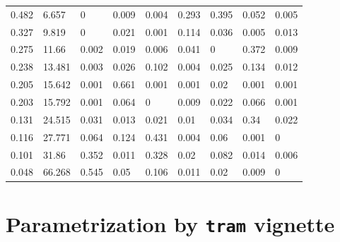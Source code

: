 \documentclass[11pt,a4paper,twoside]{book}\usepackage[]{graphicx}\usepackage[]{xcolor}
\begin{document}
\begin{table}[H]
\begin{center}
\begin{tabular}{lllllllll}
  0.482 & 6.657 & 0 & 0.009 & 0.004 & 0.293 & 0.395 & 0.052 & 0.005 \\ 
  0.327 & 9.819 & 0 & 0.021 & 0.001 & 0.114 & 0.036 & 0.005 & 0.013 \\ 
  0.275 & 11.66 & 0.002 & 0.019 & 0.006 & 0.041 & 0 & 0.372 & 0.009 \\ 
  0.238 & 13.481 & 0.003 & 0.026 & 0.102 & 0.004 & 0.025 & 0.134 & 0.012 \\ 
  0.205 & 15.642 & 0.001 & 0.661 & 0.001 & 0.001 & 0.02 & 0.001 & 0.001 \\ 
  0.203 & 15.792 & 0.001 & 0.064 & 0 & 0.009 & 0.022 & 0.066 & 0.001 \\ 
  0.131 & 24.515 & 0.031 & 0.013 & 0.021 & 0.01 & 0.034 & 0.34 & 0.022 \\ 
  0.116 & 27.771 & 0.064 & 0.124 & 0.431 & 0.004 & 0.06 & 0.001 & 0 \\ 
  0.101 & 31.86 & 0.352 & 0.011 & 0.328 & 0.02 & 0.082 & 0.014 & 0.006 \\ 
  0.048 & 66.268 & 0.545 & 0.05 & 0.106 & 0.011 & 0.02 & 0.009 & 0 \\ 
   \bottomrule
\end{tabular}
\endgroup

\end{center}\end{table}


\section{Parametrization by \texttt{tram} vignette }
\end{document}
